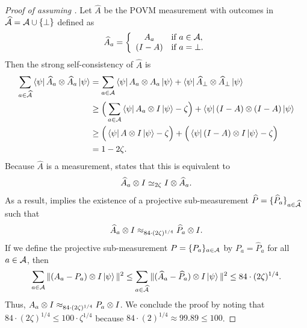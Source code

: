 \begin{proof}[Proof of  assuming ]
Let $\widehat{A}$ be the POVM measurement with outcomes in $\widehat{\mathcal{A}} = \mathcal{A} \cup \{\bot\}$ defined as
\begin{equation*}
\widehat{A}_a
= \left\{\begin{array}{cl}
		A_a & \text{if $a \in \mathcal{A}$},\\
		(I-A) & \text{if $a = \bot$.}
		\end{array}\right.
\end{equation*}
Then the strong self-consistency of $\widehat{A}$ is
\begin{align*}
\sum_{a \in \widehat{\mathcal{A}}} \bra{\psi} \widehat{A}_a \otimes \widehat{A}_a \ket{\psi}
& = \sum_{a \in \mathcal{A}} \bra{\psi} A_a \otimes A_a \ket{\psi}
	+ \bra{\psi} \widehat{A}_{\bot} \otimes \widehat{A}_{\bot} \ket{\psi}\\
& \geq \Big(\sum_{a \in \mathcal{A}} \bra{\psi} A_a \otimes I \ket{\psi} - \zeta\Big)
	+ \bra{\psi} (I-A) \otimes (I-A) \ket{\psi}\\
& \geq \Big( \bra{\psi} A \otimes I \ket{\psi} - \zeta\Big)
	+ \Big(\bra{\psi} (I-A) \otimes I \ket{\psi} - \zeta\Big)\\
& = 1 - 2\zeta.
\end{align*}
Because $\widehat{A}$ is a measurement,
 states that this is equivalent to
\begin{equation*}
\widehat{A}_a \otimes I \simeq_{2\zeta} I \otimes \widehat{A}_a.
\end{equation*}
As a result,  implies the existence of a projective sub-measurement
$\widehat{P} = \{\widehat{P}_a\}_{a \in \widehat{\mathcal{A}}}$ such that 
\begin{equation*}
\widehat{A}_a \otimes I \approx_{84\cdot(2\zeta)^{1/4}} \widehat{P}_a \otimes I.
\end{equation*}
If we define the projective sub-measurement $P = \{P_a\}_{a \in \mathcal{A}}$
by $P_a = \widehat{P}_a$ for all $a \in \mathcal{A}$, then
\begin{equation*}
\sum_{a \in \mathcal{A}} \Vert (A_a - P_a) \otimes I \ket{\psi} \Vert^2
\leq \sum_{a \in \widehat{\mathcal{A}}} \Vert (\widehat{A}_a - \widehat{P}_a) \otimes I \ket{\psi} \Vert^2
\leq 84 \cdot (2\zeta)^{1/4}.
\end{equation*}
Thus, $A_a \otimes I \approx_{84 \cdot (2\zeta)^{1/4}} P_a \otimes I$.
We conclude the proof by noting that $84 \cdot (2\zeta)^{1/4} \leq 100 \cdot \zeta^{1/4}$
because $84 \cdot (2)^{1/4} \approx 99.89\leq100$.
\end{proof}

